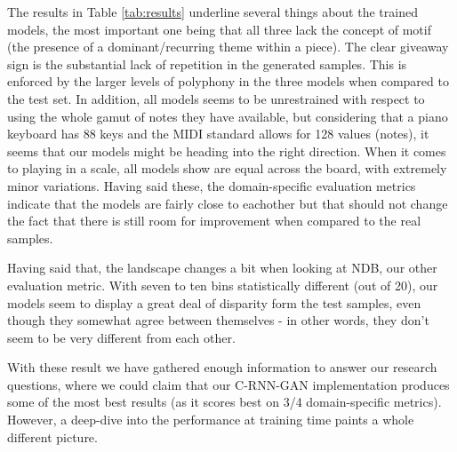 \documentclass[a4paper]{book}
\begin{document}
The results in Table \ref{tab:results} underline several things about the trained models, the most important one being that all three lack the concept of motif (the presence of a dominant/recurring theme within a piece). The clear giveaway sign is the substantial lack of repetition in the generated samples. This is enforced by the larger levels of polyphony in the three models when compared to the test set. In addition, all models seems to be unrestrained with respect to using the whole gamut of notes they have available, but considering that a piano keyboard has 88 keys and the MIDI standard allows for 128 values (notes), it seems that our models might be heading into the right direction. When it comes to playing in a scale, all models show are equal across the board, with extremely minor variations. Having said these, the domain-specific evaluation metrics indicate that the models are fairly close to eachother but that should not change the fact that there is still room for improvement when compared to the real samples.

Having said that, the landscape changes a bit when looking at NDB, our other evaluation metric. With seven to ten bins statistically different (out of 20), our models seem to display a great deal of disparity form the test samples, even though they somewhat agree between themselves - in other words, they don't seem to be very different from each other.

With these result we have gathered enough information to answer our research questions, where we could claim that our C-RNN-GAN implementation produces some of the most best results (as it scores best on 3/4 domain-specific metrics). However, a deep-dive into the performance at training time paints a whole different picture.
\end{document}

